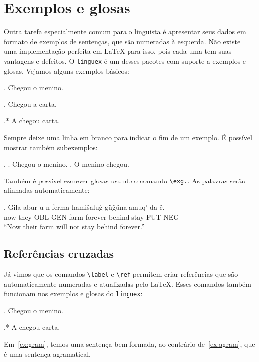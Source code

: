 \documentclass[11pt,a4paper,oneside]{article}
\begin{document}
\section{Exemplos e glosas}

Outra tarefa especialmente comum para o linguista é apresentar seus dados em
formato de exemplos de sentenças, que são numeradas à esquerda. Não existe uma
implementação perfeita em LaTeX para isso, pois cada uma tem suas vantagens e
defeitos. O \verb+linguex+ é um desses pacotes com suporte a exemplos e glosas.
Vejamos alguns exemplos básicos:

\ex. Chegou o menino.

\ex. Chegou a carta.

\ex.* A chegou carta.

Sempre deixe uma linha em branco para indicar o fim de um exemplo. É possível
mostrar também subexemplos:

\ex.
  \a. Chegou o menino.
  \b. O menino chegou.

Também é possível escrever glosas usando o comando \verb+\exg.+. As palavras
serão alinhadas automaticamente:

\exg.
  Gila abur-u-n ferma hamišaluǧ güǧüna amuq’-da-č.\\
  now they-OBL-GEN farm forever behind stay-FUT-NEG\\
  ``Now their farm will not stay behind forever.''

\subsection{Referências cruzadas}

Já vimos que os comandos \verb+\label+ e \verb+\ref+ permitem criar referências
que são automaticamente numeradas e atualizadas pelo LaTeX. Esses comandos
também funcionam nos exemplos e glosas do \verb+linguex+:

\ex.\label{ex:gram} Chegou o menino.

\ex.*\label{ex:agram} A chegou carta.

Em~\ref{ex:gram}, temos uma sentença bem formada, ao contrário
de~\ref{ex:agram}, que é uma sentença agramatical.
\end{document}
